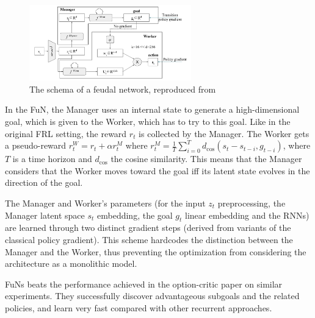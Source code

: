 \documentclass{article}
\begin{document}
\begin{figure}
    \centering
    \includegraphics[width=7cm]{images/fun.png}
    \caption{The schema of a feudal network, reproduced from \cite{vezhnevets_feudal_2017}}
    \label{fig:fun}
\end{figure}

In the FuN, the Manager uses an internal state to generate a high-dimensional goal, which is given to the Worker, which has to try to this goal. Like in the original FRL setting, the reward $r_t$ is collected by the Manager. The Worker gets a pseudo-reward $r^W_t = r_t + \alpha r^M_t$ where $r^M_t = \frac 1T \sum_{i=0}^T d_\mathrm{cos}(s_t-s_{t-i}, g_{t-i})$, where $T$ is a time horizon and $d_\mathrm{cos}$ the cosine similarity. This means that the Manager considers that the Worker moves toward the goal iff its latent state evolves in the direction of the goal.

The Manager and Worker's parameters (for the input $z_t$ preprocessing, the Manager latent space $s_t$ embedding, the goal $g_t$ linear embedding and the RNNs) are learned through two distinct gradient steps (derived from variants of the classical policy gradient). This scheme hardcodes the distinction between the Manager and the Worker, thus preventing the optimization from considering the architecture as a monolithic model.

FuNs beats the performance achieved in the option-critic paper \cite{bacon_option-critic_2016} on similar experiments. They successfully discover advantageous subgoals and the related policies, and learn very fast compared with other recurrent approaches.

\subsection{}

\small


\end{document}
